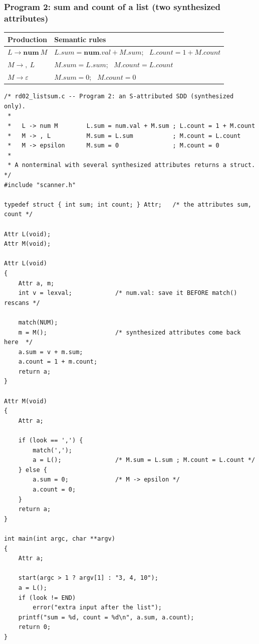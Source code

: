 \documentclass[11pt,a4paper]{article}
\newcommand{\at}[2]{\ensuremath{#1.\mathit{#2}}}
\newcommand{\tok}[1]{\ensuremath{\mathtt{#1}}}
\begin{document}
\subsubsection*{Program 2: sum and count of a list (two synthesized attributes)}
\begin{center}
\small
\begin{tabular}{@{}l l@{}}
\toprule
\textbf{Production} & \textbf{Semantic rules} \\ \midrule
$L \to \mathbf{num}\ M$ & $\at{L}{sum}=\at{\mathbf{num}}{val}+\at{M}{sum}$; \ $\at{L}{count}=1+\at{M}{count}$ \\
$M \to \tok{,}\ L$ & $\at{M}{sum}=\at{L}{sum}$; \ $\at{M}{count}=\at{L}{count}$ \\
$M \to \varepsilon$ & $\at{M}{sum}=0$; \ $\at{M}{count}=0$ \\ \bottomrule
\end{tabular}
\end{center}

\begin{lstlisting}[basicstyle=\ttfamily\footnotesize,tabsize=4]
/* rd02_listsum.c -- Program 2: an S-attributed SDD (synthesized only).
 *
 *   L -> num M        L.sum = num.val + M.sum ; L.count = 1 + M.count
 *   M -> , L          M.sum = L.sum           ; M.count = L.count
 *   M -> epsilon      M.sum = 0               ; M.count = 0
 *
 * A nonterminal with several synthesized attributes returns a struct. */
#include "scanner.h"

typedef struct { int sum; int count; } Attr;   /* the attributes sum, count */

Attr L(void);
Attr M(void);

Attr L(void)
{
    Attr a, m;
    int v = lexval;            /* num.val: save it BEFORE match() rescans */

    match(NUM);
    m = M();                   /* synthesized attributes come back here  */
    a.sum = v + m.sum;
    a.count = 1 + m.count;
    return a;
}

Attr M(void)
{
    Attr a;

    if (look == ',') {
        match(',');
        a = L();               /* M.sum = L.sum ; M.count = L.count */
    } else {
        a.sum = 0;             /* M -> epsilon */
        a.count = 0;
    }
    return a;
}

int main(int argc, char **argv)
{
    Attr a;

    start(argc > 1 ? argv[1] : "3, 4, 10");
    a = L();
    if (look != END)
        error("extra input after the list");
    printf("sum = %d, count = %d\n", a.sum, a.count);
    return 0;
}
\end{lstlisting}
\end{document}
